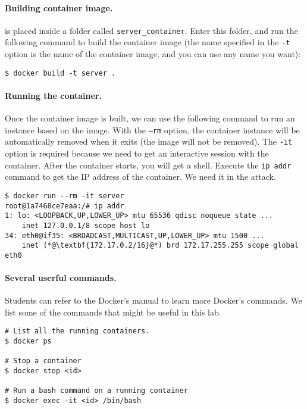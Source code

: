 \paragraph{Building container image.}
\dockerfile is placed inside a folder called \texttt{server\_container}. Enter 
this folder, and run the following command to build the container image (the 
name specified in the \texttt{-t} option is the name of the container image, and you can
use any name you want): 

\begin{lstlisting}
$ docker build -t server . 
\end{lstlisting}



\paragraph{Running the container.}
Once the container image is built, we can use the following command to run an
instance based on the image. With the \texttt{--rm} option, the container instance will be 
automatically removed when it exits (the image will not be removed). 
The \texttt{-it} option is required because we need to get an interactive session
with the container. After the container starts, you will get a shell.
Execute the \texttt{ip addr} command to get the IP address of the container. 
We need it in the attack. 

\begin{lstlisting}
$ docker run --rm -it server 
root@1a7468ce7eaa:/# ip addr
1: lo: <LOOPBACK,UP,LOWER_UP> mtu 65536 qdisc noqueue state ...
    inet 127.0.0.1/8 scope host lo
34: eth0@if35: <BROADCAST,MULTICAST,UP,LOWER_UP> mtu 1500 ...
    inet (*@\textbf{172.17.0.2/16}@*) brd 172.17.255.255 scope global eth0
\end{lstlisting}


\paragraph{Several userful commands.}
Students can refer to the Docker's manual to learn more Docker's commands. 
We list some of the commands that might be useful in this lab. 

\begin{lstlisting}
# List all the running containers. 
$ docker ps 

# Stop a container 
$ docker stop <id>

# Run a bash command on a running container 
$ docker exec -it <id> /bin/bash
\end{lstlisting}
 


